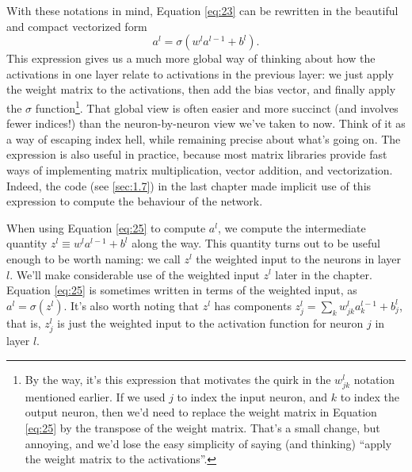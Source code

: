 \documentclass[a4paper,twoside,10pt]{book}
\begin{document}
With these notations in mind, Equation \ref{eq:23} can be rewritten in the beautiful and compact vectorized form
\begin{equation}
a^{l} = \sigma(w^l a^{l-1}+b^l).
\tag{25}\label{eq:25}
\end{equation}
This expression gives us a much more global way of thinking about how the activations in one layer relate to activations in the previous layer: we just apply the weight matrix to the activations, then add the bias vector, and finally apply the $\sigma$ function\footnote{By the way, it's this expression that motivates the quirk in the $w^l_{jk}$ notation mentioned earlier. If we used $j$ to index the input neuron, and $k$ to index the output neuron, then we'd need to replace the weight matrix in Equation \ref{eq:25} by the transpose of the weight matrix. That's a small change, but annoying, and we'd lose the easy simplicity of saying (and thinking) ``apply the weight matrix to the activations''.}. That global view is often easier and more succinct (and involves fewer indices!) than the neuron-by-neuron view we've taken to now. Think of it as a way of escaping index hell, while remaining precise about what's going on. The expression is also useful in practice, because most matrix libraries provide fast ways of implementing matrix multiplication, vector addition, and vectorization. Indeed, the code (see \ref{sec:1.7}) in the last chapter made implicit use of this expression to compute the behaviour of the network.

When using Equation \ref{eq:25} to compute $a^l$, we compute the intermediate quantity $z^l \equiv w^l a^{l-1}+b^l$ along the way. This quantity turns out to be useful enough to be worth naming: we call $z^l$ the weighted input to the neurons in layer $l$. We'll make considerable use of the weighted input $z^l$ later in the chapter. Equation \ref{eq:25} is sometimes written in terms of the weighted input, as $a^l=\sigma(z^l)$. It's also worth noting that $z^l$ has components $z^l_j= \sum_k w^l_{jk} a^{l-1}_k+b^l_j$, that is, $z^l_j$ is just the weighted input to the activation function for neuron $j$ in layer $l$.
\end{document}
